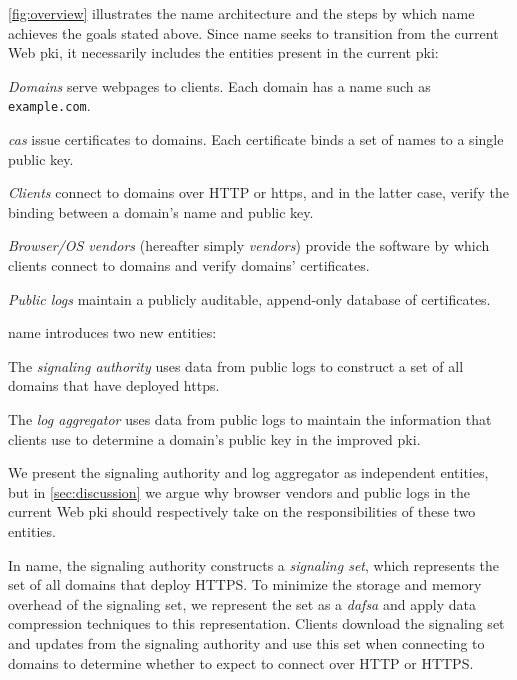 \autoref{fig:overview} illustrates the \ac{name} architecture and the steps by
which \ac{name} achieves the goals stated above. Since \ac{name} seeks to
transition from the current Web \ac{pki}, it necessarily includes the entities
present in the current \ac{pki}:
\begin{compactitem}
\item \emph{Domains} serve webpages to clients. Each domain has a name such as
  \texttt{example.com}.
\item \emph{\acp{ca}} issue certificates to domains. Each certificate binds a
  set of names to a single public key.
\item \emph{Clients} connect to domains over HTTP or \ac{https}, and in the
  latter case, verify the binding between a domain's name and public key.
\item \emph{Browser/OS vendors} (hereafter simply \emph{vendors}) provide the
  software by which clients connect to domains and verify domains' certificates.
\item \emph{Public logs} maintain a publicly auditable, append-only database of
  certificates.
\end{compactitem}
\ac{name} introduces two new entities:
\begin{compactitem}
\item The \emph{signaling authority} uses data from public logs to construct a
  set of all domains that have deployed \ac{https}.
\item The \emph{log aggregator} uses data from public logs to maintain the
  information that clients use to determine a domain's public key in the
  improved \ac{pki}.
\end{compactitem}
We present the signaling authority and log aggregator as independent entities,
but in \autoref{sec:discussion} we argue why browser vendors and public logs in
the current Web \ac{pki} should respectively take on the responsibilities of
these two entities.

In \ac{name}, the signaling authority constructs a \emph{signaling set}, which
represents the set of all domains that deploy HTTPS. To minimize the storage and
memory overhead of the signaling set, we represent the set as a
\emph{\ac{dafsa}} and apply data compression techniques to this representation.
 Clients download the signaling set and updates from the
signaling authority and use this set when connecting to domains to determine
whether to expect to connect over HTTP or HTTPS.

